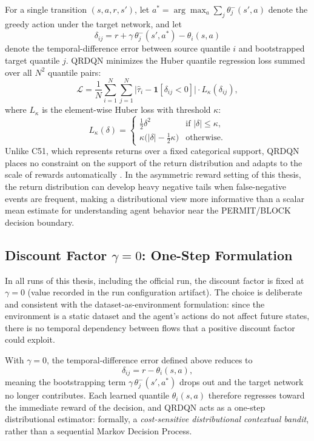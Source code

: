 For a single transition $(s, a, r, s')$, let $a^* = \arg\max_a \sum_j \theta_j^-(s', a)$ denote the greedy action under the target network, and let
\[
    \delta_{ij} = r + \gamma\,\theta_j^-(s', a^*) - \theta_i(s, a)
\]
denote the temporal-difference error between source quantile $i$ and bootstrapped target quantile $j$. QRDQN minimizes the Huber quantile regression loss summed over all $N^2$ quantile pairs:
\[
    \mathcal{L} = \frac{1}{N}\sum_{i=1}^{N}\sum_{j=1}^{N}
        \bigl|\hat{\tau}_i - \mathbf{1}[\delta_{ij} < 0]\bigr|\cdot L_\kappa(\delta_{ij}),
\]
where $L_\kappa$ is the element-wise Huber loss with threshold $\kappa$:
\[
    L_\kappa(\delta) = \begin{cases} \tfrac{1}{2}\delta^2 & \text{if } |\delta| \leq \kappa, \\ \kappa\bigl(|\delta| - \tfrac{1}{2}\kappa\bigr) & \text{otherwise.}\end{cases}
\]
Unlike C51, which represents returns over a fixed categorical support, QRDQN places no constraint on the support of the return distribution and adapts to the scale of rewards automatically \parencite{Bellemare2017DistributionalRL}. In the asymmetric reward setting of this thesis, the return distribution can develop heavy negative tails when false-negative events are frequent, making a distributional view more informative than a scalar mean estimate for understanding agent behavior near the PERMIT/BLOCK decision boundary.

\subsection{Discount Factor $\gamma = 0$: One-Step Formulation}
In all runs of this thesis, including the official run, the discount factor is fixed at $\gamma = 0$ (value recorded in the run configuration artifact). The choice is deliberate and consistent with the dataset-as-environment formulation: since the environment is a static dataset and the agent's actions do not affect future states, there is no temporal dependency between flows that a positive discount factor could exploit.

With $\gamma = 0$, the temporal-difference error defined above reduces to
\[
    \delta_{ij} = r - \theta_i(s, a),
\]
meaning the bootstrapping term $\gamma\,\theta_j^-(s', a^*)$ drops out and the target network no longer contributes. Each learned quantile $\theta_i(s,a)$ therefore regresses toward the immediate reward of the decision, and QRDQN acts as a one-step distributional estimator: formally, a \emph{cost-sensitive distributional contextual bandit}, rather than a sequential Markov Decision Process.

